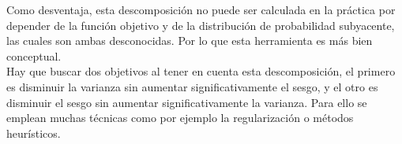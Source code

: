     Como desventaja, esta descomposición no puede ser calculada en la práctica por depender de la función objetivo y de la distribución de probabilidad subyacente, las cuales son ambas desconocidas. Por lo que esta herramienta es más bien conceptual. \\
    
    Hay que buscar dos objetivos al tener en cuenta esta descomposición, el primero es disminuir la varianza sin aumentar significativamente el sesgo, y el otro es disminuir el sesgo sin aumentar significativamente la varianza. Para ello se emplean muchas técnicas como por ejemplo la regularización o métodos heurísticos. \\
    

\endinput
